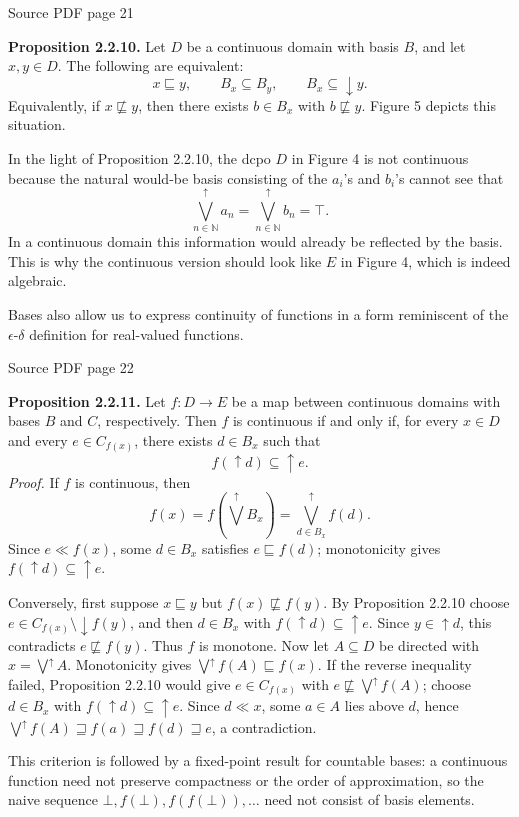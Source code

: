 \documentclass[11pt]{article}
\newcommand{\leanmarker}[2]{%
  \Needspace{3\baselineskip}%
  \marginnote{\hyperlink{#1}{\color{LeanTeal}\fbox{\scriptsize Lean}}}%
  \hypertarget{#1}{\textbf{#2.}}%
}
\newcommand{\sourcepage}[1]{\par\medskip\noindent\textcolor{SourceGray}{\scriptsize Source PDF page #1}\par\smallskip}
\begin{document}
\sourcepage{21}
\leanmarker{prop-2-2-10}{Proposition 2.2.10} Let $D$ be a continuous domain with basis $B$, and let $x,y\in D$. The following are equivalent:
\[
  x\sqsubseteq y,
  \qquad B_x\subseteq B_y,
  \qquad B_x\subseteq \downarrow y.
\]
Equivalently, if $x\not\sqsubseteq y$, then there exists $b\in B_x$ with $b\not\sqsubseteq y$. Figure 5 depicts this situation.

In the light of Proposition 2.2.10, the dcpo $D$ in Figure 4 is not continuous because the natural would-be basis consisting of the $a_i$'s and $b_i$'s cannot see that
\[
  \bigvee_{n\in\mathbb{N}}^{\uparrow} a_n
  =\bigvee_{n\in\mathbb{N}}^{\uparrow} b_n
  =\top.
\]
In a continuous domain this information would already be reflected by the basis. This is why the continuous version should look like $E$ in Figure 4, which is indeed algebraic.

Bases also allow us to express continuity of functions in a form reminiscent of the $\epsilon$-$\delta$ definition for real-valued functions.

\sourcepage{22}
\leanmarker{prop-2-2-11}{Proposition 2.2.11} Let $f:D\to E$ be a map between continuous domains with bases $B$ and $C$, respectively. Then $f$ is continuous if and only if, for every $x\in D$ and every $e\in C_{f(x)}$, there exists $d\in B_x$ such that
\[
  f(\uparrow d)\subseteq \uparrow e.
\]
\emph{Proof.} If $f$ is continuous, then
\[
  f(x)=f\left(\bigvee^{\uparrow}B_x\right)
      =\bigvee_{d\in B_x}^{\uparrow} f(d).
\]
Since $e\ll f(x)$, some $d\in B_x$ satisfies $e\sqsubseteq f(d)$; monotonicity gives $f(\uparrow d)\subseteq\uparrow e$.

Conversely, first suppose $x\sqsubseteq y$ but $f(x)\not\sqsubseteq f(y)$. By Proposition 2.2.10 choose $e\in C_{f(x)}\setminus\downarrow f(y)$, and then $d\in B_x$ with $f(\uparrow d)\subseteq\uparrow e$. Since $y\in\uparrow d$, this contradicts $e\not\sqsubseteq f(y)$. Thus $f$ is monotone. Now let $A\subseteq D$ be directed with $x=\bigvee^{\uparrow}A$. Monotonicity gives $\bigvee^{\uparrow}f(A)\sqsubseteq f(x)$. If the reverse inequality failed, Proposition 2.2.10 would give $e\in C_{f(x)}$ with $e\not\sqsubseteq\bigvee^{\uparrow}f(A)$; choose $d\in B_x$ with $f(\uparrow d)\subseteq\uparrow e$. Since $d\ll x$, some $a\in A$ lies above $d$, hence $\bigvee^{\uparrow}f(A)\sqsupseteq f(a)\sqsupseteq f(d)\sqsupseteq e$, a contradiction.

This criterion is followed by a fixed-point result for countable bases: a continuous function need not preserve compactness or the order of approximation, so the naive sequence $\bot,f(\bot),f(f(\bot)),\ldots$ need not consist of basis elements.
\end{document}
